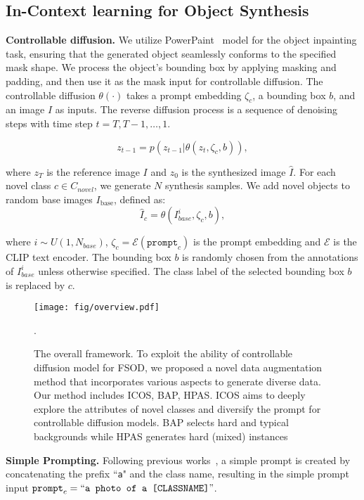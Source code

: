 \subsection{In-Context learning for Object Synthesis}
\textbf{Controllable diffusion.} We utilize PowerPaint~\citep{zhuang2023task} model for the object inpainting task, ensuring that the generated object seamlessly conforms to the specified mask shape. We process the object's bounding box by applying masking and padding, and then use it as the mask input for controllable diffusion. The controllable diffusion $\theta(\cdot)$ takes a prompt embedding $\zeta_c$, a bounding box $b$, and an image $I$ as inputs. The reverse diffusion process is a sequence of denoising steps with time step $t = T,T-1,\ldots,1$.

\begin{equation}
\label{eq:CD}
   z_{t-1} = p(z_{t-1}|\theta(z_t, \zeta_c, b)),
\end{equation}

where $z_T$ is the reference image $I$ and $z_{0}$ is the synthesized image $\hat{I}$.  For each novel class $c \in C_{novel}$, we generate $N$ synthesis samples. We add novel objects to random base images $I_{\text{base}}$, defined as:
\begin{equation}
    \hat{I}_{c} = \theta(I_{base}^{i}, \zeta_{c}, b),
\end{equation}

where $i \sim U(1,N_{base})$, $\zeta_{c} = \mathcal{E}(\texttt{prompt}_c)$ is the prompt embedding and $\mathcal{E}$ is the CLIP text encoder. The bounding box $b$ is randomly chosen from the annotations of $I_{base}^i$ unless otherwise specified. The class label of the selected bounding box $b$ is replaced by $c$.



\begin{figure*}[!t]
    \centering
    \texttt{[image: fig/overview.pdf]}
    \caption{The overall framework. To exploit the ability of controllable diffusion model for FSOD, we proposed a novel data augmentation method that incorporates various aspects to generate diverse data. Our method includes ICOS, BAP, HPAS. ICOS aims to deeply explore the attributes of novel classes and diversify the prompt for controllable diffusion models. BAP selects hard and typical backgrounds while HPAS generates  hard (mixed) instances}.   
    \label{fig:overview}
\end{figure*}

\textbf{Simple Prompting.} Following previous works~\citep{lin2023explore, fang2024data, wang2024snida}, a simple prompt is created by concatenating the prefix ``\texttt{a}" and the class name, resulting in the simple prompt input $\texttt{prompt}_c = ``\texttt{a photo of a [CLASSNAME]}"$.



